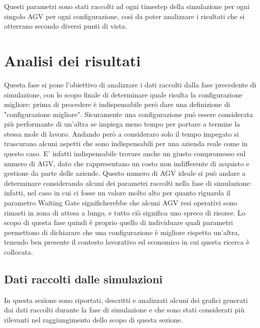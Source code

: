 \documentclass[12pt]{article}
\begin{document}
Questi parametri sono stati raccolti ad ogni timestep della simulazione per ogni singolo AGV per ogni configurazione, così da poter analizzare i risultati che si otterrano secondo diversi punti di vista.


\newpage
\section{Analisi dei risultati}

Questa fase si pone l'obiettivo di analizzare i dati raccolti dalla fase precedente di simulazione, con lo scopo finale di determinare quale risulta la configurazione migliore: prima di procedere è indispensabile però dare una definizione di "configurazione migliore". \newline
Sicuramente una configurazione può essere considerata più performante di un'altra se impiega meno tempo per portare a termine la stessa mole di lavoro. Andando però a consideraro solo il tempo impegato si trascurano alcuni aspetti che sono indispensabili per una azienda reale come in questo caso. E' infatti indispensabile trovare anche un giusto compromesso sul numero di AGV, dato che rappresentano un costo non indifferente di acquisto e gestione da parte delle aziende. \newline 
Questo numero di AGV ideale si può andare a determinare considerando alcuni dei parametri raccolti nella fase di simulazione: infatti, nel caso in cui ci fosse un valore molto alto per quanto riguarda il parametro Waiting Gate significherebbe che alcuni AGV resi operativi sono rimasti in zona di attesa a lungo, e tutto ciò significa uno spreco di risorse. \newline
\newline
Lo scopo di questa fase quindi è proprio quello di individuare quali parametri permettono di dichiarare che una configurazione è migliore rispetto un'altra, tenendo ben presente il contesto lavorativo ed economico in cui questa ricerca è collocata. 

\subsection{Dati raccolti dalle simulazioni}
In questa sezione sono riportati, descritti e analizzati alcuni dei grafici generati dai dati raccolti durante la fase di simulazione e che sono stati considerati più rilevanti nel raggiungimento dello scopo di questa sezione. \newline
\end{document}
